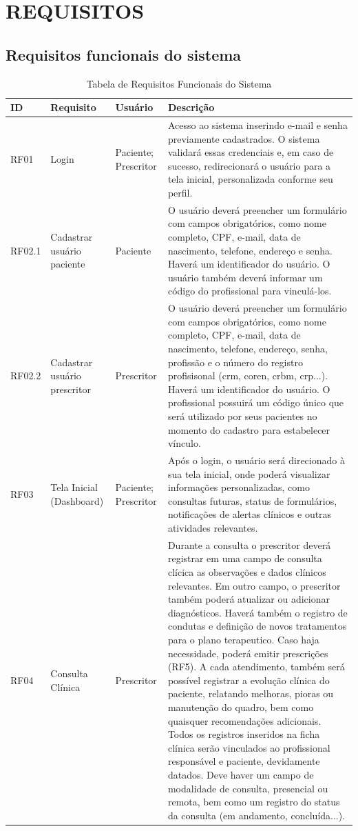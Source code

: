 \href{}{}\documentclass[12pt,portuguese,oneside]{article}
\begin{document}
\section{REQUISITOS}

\subsection{Requisitos funcionais do sistema}

\begin{table}[H]
\centering
\caption{Tabela de Requisitos Funcionais do Sistema}
\begin{tabularx}{\textwidth}{|>{\raggedright\arraybackslash}p{1cm}|>{\raggedright\arraybackslash}p{2.5cm}|>{\raggedright\arraybackslash}p{2cm}|>{\raggedright\arraybackslash}X|}
\hline
\rowcolor{gray!20}
\textbf{ID} & \textbf{Requisito} & \textbf{Usuário} & \textbf{Descrição}\\
\hline
RF01 & Login & Paciente; Prescritor & Acesso ao sistema inserindo e-mail e senha previamente cadastrados. O sistema validará essas credenciais e, em caso de sucesso, redirecionará o usuário para a tela inicial, personalizada conforme seu perfil.\\
\hline
RF02.1 & Cadastrar usuário paciente & Paciente & O usuário deverá preencher um formulário com campos obrigatórios, como nome completo, CPF, e-mail, data de nascimento, telefone, endereço e senha. Haverá um identificador do usuário. O usuário também deverá informar um código do profissional para vinculá-los.\\
\hline
RF02.2 & Cadastrar usuário prescritor & Prescritor & O usuário deverá preencher um formulário com campos obrigatórios, como nome completo, CPF, e-mail, data de nascimento, telefone, endereço, senha, profissão e o número do registro profisisonal (crm, coren, crbm, crp...). Haverá um identificador do usuário. O profissional possuirá um código único que será utilizado por seus pacientes no momento do cadastro para estabelecer vínculo.\\
\hline
RF03 & Tela Inicial (Dashboard) & Paciente; Prescritor & Após o login, o usuário será direcionado à sua tela inicial, onde poderá visualizar informações personalizadas, como consultas futuras, status de formulários, notificações de alertas clínicos e outras atividades relevantes.\\
\hline
RF04 & Consulta Clínica & Prescritor & Durante a consulta o prescritor deverá registrar em uma campo de consulta clícica as observações e dados clínicos relevantes. Em outro campo, o prescritor também poderá atualizar ou adicionar diagnósticos. Haverá também o registro de condutas e definição de novos tratamentos para o plano terapeutico. Caso haja necessidade, poderá emitir prescrições (RF5). A cada atendimento, também será possível registrar a evolução clínica do paciente, relatando melhoras, pioras ou manutenção do quadro, bem como quaisquer recomendações adicionais. Todos os registros inseridos na ficha clínica serão vinculados ao profissional responsável e paciente, devidamente datados. Deve haver um campo de modalidade de consulta, presencial ou remota, bem como um registro do status da consulta (em andamento, concluída...). \\

\end{tabularx}
\end{table}
\end{document}

